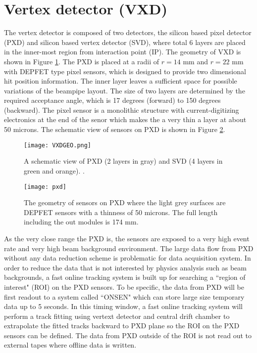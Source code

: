 \section{Vertex detector (VXD)}
The vertex detector is composed of two detectors, the silicon based pixel detector (PXD) and silicon based vertex detector (SVD), where total 6 layers are placed in the inner-most region from interaction point (IP).  The geometry of VXD is shown in Figure \ref{fig:svdgeo}. The PXD is placed at a radii of $r=14$ mm and $r=22$ mm with DEPFET\cite{Abe:2010gxa} type pixel sensors, which is designed to provide two dimensional hit position information. The inner layer leaves a sufficient space for possible variations of the beampipe layout. The size of two layers are determined by the required acceptance angle, which is 17 degrees (forward) to 150 degrees (backward). The pixel sensor is a monolithic structure with current-digitizing electronics at the end of the senor which makes the a very thin a layer at about 50 microns. The schematic view of sensors on PXD is shown in Figure \ref{fig:pxd}.
\begin{figure}[htpb]
	\centering
	\texttt{[image: VXDGEO.png]}
	\caption{A schematic view of PXD (2 layers in gray) and SVD (4 layers in green and orange). \cite{Abe:2010gxa}.}
	\label{fig:svdgeo}
\end{figure}
\begin{figure}[htpb]
\centering
\texttt{[image: pxd]}
\caption{The geometry of sensors on PXD where the light grey surfaces are DEPFET sensors with a thinness of 50 microns. The full length including the out modules is 174 mm\cite{Abe:2010gxa}. }
\label{fig:pxd}
\end{figure}
 As the very close range the PXD is, the sensors are exposed to a very high event rate and very high beam background environment. The large data flow from PXD without any data reduction scheme is problematic for data acquisition system. In order to reduce the data that is not interested by physics analysis such as beam backgrounds, a fast online tracking system is built up for searching a ``region of interest" (ROI) on the PXD sensors. To be specific, the data from PXD will be first readout to a system called ``ONSEN" which can store large size temporary data up to 5 seconds. In this timing window, a fast online tracking system will perform a track fitting using vertext detector and central drift chamber to extrapolate the fitted tracks backward to PXD plane so the ROI on the PXD sensors can be defined. The data from PXD outside of the ROI is not read out to external tapes where offline data is written. 


